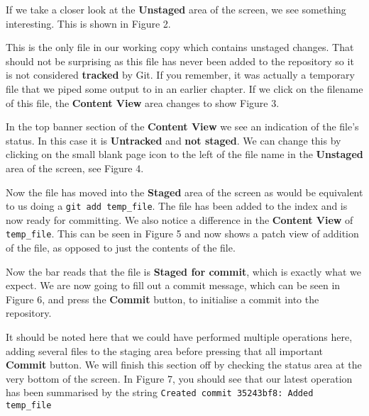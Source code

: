 If we take a closer look at the \textbf{Unstaged} area of the screen, we see something interesting.
This is shown in Figure 2.


This is the only file in our working copy which contains unstaged changes.
That should not be surprising as this file has never been added to the repository so it is not considered \textbf{tracked} by Git.
If you remember, it was actually a temporary file that we piped some output to in an earlier chapter.
If we click on the filename of this file, the \textbf{Content View} area changes to show Figure 3.


In the top banner section of the \textbf{Content View} we see an indication of the file's status.
In this case it is \textbf{Untracked} and \textbf{not staged}.
We can change this by clicking on the small blank page icon to the left of the file name in the \textbf{Unstaged} area of the screen, see Figure 4.


Now the file has moved into the \textbf{Staged} area of the screen as would be equivalent to us doing a \texttt{git add temp\_file}.
The file has been added to the index and is now ready for committing.
We also notice a difference in the \textbf{Content View} of \texttt{temp\_file}.
This can be seen in Figure 5 and now shows a patch view of addition of the file, as opposed to just the contents of the file.


Now the bar reads that the file is \textbf{Staged for commit}, which is exactly what we expect.
We are now going to fill out a commit message, which can be seen in Figure 6, and press the \textbf{Commit} button, to initialise a commit into the repository.


It should be noted here that we could have performed multiple operations here, adding several files to the staging area before pressing that all important \textbf{Commit} button.
We will finish this section off by checking the status area at the very bottom of the screen.
In Figure 7, you should see that our latest operation has been summarised by the string \texttt{Created commit 35243bf8: Added temp\_file}

